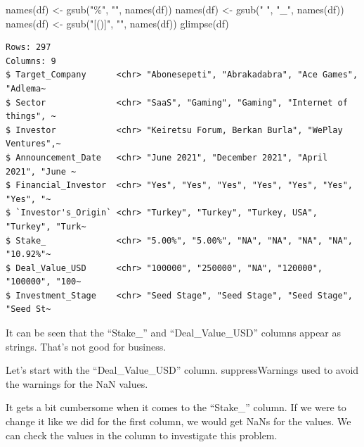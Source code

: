 \documentclass[
  letterpaper,
  DIV=11,
  numbers=noendperiod]{scrreprt}
\newenvironment{Shaded}{\begin{snugshade}}{\end{snugshade}}
\newcommand{\FunctionTok}[1]{\textcolor[rgb]{0.28,0.35,0.67}{#1}}
\newcommand{\NormalTok}[1]{\textcolor[rgb]{0.00,0.23,0.31}{#1}}
\newcommand{\OtherTok}[1]{\textcolor[rgb]{0.00,0.23,0.31}{#1}}
\newcommand{\SpecialCharTok}[1]{\textcolor[rgb]{0.37,0.37,0.37}{#1}}
\newcommand{\StringTok}[1]{\textcolor[rgb]{0.13,0.47,0.30}{#1}}
\begin{document}
\begin{Shaded}
\begin{Highlighting}[]
\FunctionTok{names}\NormalTok{(df) }\OtherTok{\textless{}{-}} \FunctionTok{gsub}\NormalTok{(}\StringTok{"\%"}\NormalTok{, }\StringTok{""}\NormalTok{, }\FunctionTok{names}\NormalTok{(df))}
\FunctionTok{names}\NormalTok{(df) }\OtherTok{\textless{}{-}} \FunctionTok{gsub}\NormalTok{(}\StringTok{" "}\NormalTok{, }\StringTok{"\_"}\NormalTok{, }\FunctionTok{names}\NormalTok{(df))}
\FunctionTok{names}\NormalTok{(df) }\OtherTok{\textless{}{-}} \FunctionTok{gsub}\NormalTok{(}\StringTok{"[()]"}\NormalTok{, }\StringTok{""}\NormalTok{, }\FunctionTok{names}\NormalTok{(df))}
\FunctionTok{glimpse}\NormalTok{(df)}
\end{Highlighting}
\end{Shaded}

\begin{verbatim}
Rows: 297
Columns: 9
$ Target_Company      <chr> "Abonesepeti", "Abrakadabra", "Ace Games", "Adlema~
$ Sector              <chr> "SaaS", "Gaming", "Gaming", "Internet of things", ~
$ Investor            <chr> "Keiretsu Forum, Berkan Burla", "WePlay Ventures",~
$ Announcement_Date   <chr> "June 2021", "December 2021", "April 2021", "June ~
$ Financial_Investor  <chr> "Yes", "Yes", "Yes", "Yes", "Yes", "Yes", "Yes", "~
$ `Investor's_Origin` <chr> "Turkey", "Turkey", "Turkey, USA", "Turkey", "Turk~
$ Stake_              <chr> "5.00%", "5.00%", "NA", "NA", "NA", "NA", "10.92%"~
$ Deal_Value_USD      <chr> "100000", "250000", "NA", "120000", "100000", "100~
$ Investment_Stage    <chr> "Seed Stage", "Seed Stage", "Seed Stage", "Seed St~
\end{verbatim}

It can be seen that the ``Stake\_'' and ``Deal\_Value\_USD'' columns
appear as strings. That's not good for business.

Let's start with the ``Deal\_Value\_USD'' column. suppressWarnings used
to avoid the warnings for the NaN values.

\begin{Shaded}
\end{Shaded}

It gets a bit cumbersome when it comes to the ``Stake\_'' column. If we
were to change it like we did for the first column, we would get NaNs
for the values. We can check the values in the column to investigate
this problem.
\end{document}
